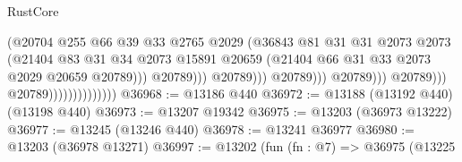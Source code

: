 \begin{lexlean}{RustCore}
\begin{coremodule}
                                                            (@20704
                                                              @255
                                                              @66
                                                              @39
                                                              @33
                                                              @2765
                                                              @2029
                                                              (@36843
                                                                @81
                                                                @31
                                                                @31
                                                                @2073
                                                                @2073
                                                                (@21404
                                                                  @83
                                                                  @31
                                                                  @34
                                                                  @2073
                                                                  @15891
                                                                  @20659
                                                                  (@21404
                                                                    @66
                                                                    @31
                                                                    @33
                                                                    @2073
                                                                    @2029
                                                                    @20659
                                                                    @20789)))
                                                              @20789)))
                                                        @20789)))
                                                  @20789)))
                                            @20789)))
                                      @20789)))
                                @20789))))))))))))))
@36968 := @13186 @440
@36972 := @13188 (@13192 @440) (@13198 @440)
@36973 := @13207 @19342
@36975 := @13203 (@36973 @13222)
@36977 := @13245 (@13246 @440)
@36978 := @13241 @36977
@36980 := @13203 (@36978 @13271)
@36997 := @13202
    (fun (fn : @7) =>
    @36975
      (@13225

\end{coremodule}
\end{lexlean}
